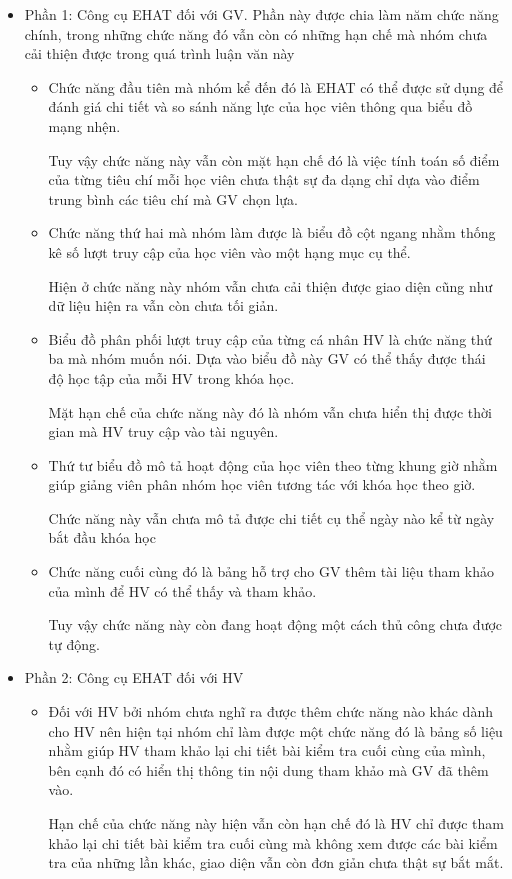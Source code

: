 \begin{itemize}
	\item Phần 1: Công cụ EHAT đối với GV.
	Phần này được chia làm năm chức năng chính, trong những chức năng đó vẫn còn có những hạn chế mà nhóm chưa cải thiện được trong quá trình luận văn này
	\begin{itemize}
		\item Chức năng đầu tiên mà nhóm kể đến đó là EHAT có thể được sử dụng để đánh giá chi tiết và so sánh năng lực của học viên thông qua biểu đồ mạng nhện. 
		
		Tuy vậy chức năng này vẫn còn mặt hạn chế đó là việc tính toán số điểm của từng tiêu chí mỗi học viên chưa thật sự đa dạng chỉ dựa vào điểm trung bình các tiêu chí mà GV chọn lựa.
		
		\item Chức năng thứ hai mà nhóm làm được là biểu đồ cột ngang nhằm thống kê số lượt truy cập của học viên vào một hạng mục cụ thể. 
		
		Hiện ở chức năng này nhóm vẫn chưa cải thiện được giao diện cũng như dữ liệu hiện ra vẫn còn chưa tối giản.
		
		\item Biểu đồ phân phối lượt truy cập của từng cá nhân HV là chức năng thứ ba mà nhóm muốn nói. Dựa vào biểu đồ này GV có thể thấy được thái độ học tập của mỗi HV trong khóa học. 
		
		Mặt hạn chế của chức năng này đó là nhóm vẫn chưa hiển thị được thời gian mà HV truy cập vào tài nguyên.
		
		\item Thứ tư biểu đồ mô tả hoạt động của học viên theo từng khung giờ nhằm giúp giảng viên phân nhóm học viên tương tác với khóa học theo giờ.
		
		Chức năng này vẫn chưa mô tả được chi tiết cụ thể ngày nào kể từ ngày bắt đầu khóa học
		
		\item Chức năng cuối cùng đó là bảng hỗ trợ cho GV thêm tài liệu tham khảo của mình để HV có thể thấy và tham khảo. 
		
		Tuy vậy chức năng này còn đang hoạt động một cách thủ công chưa được tự động.
	\end{itemize}

	\vskip 3cm
	\item Phần 2: Công cụ EHAT đối với HV
	
	\begin{itemize}
		\item Đối với HV bởi nhóm chưa nghĩ ra được thêm chức năng nào khác dành cho HV nên hiện tại nhóm chỉ làm được một chức năng đó là bảng số liệu nhằm giúp HV tham khảo lại chi tiết bài kiểm tra cuối cùng của mình, bên cạnh đó có hiển thị thông tin nội dung tham khảo mà GV đã thêm vào.
		
		Hạn chế của chức năng này hiện vẫn còn hạn chế đó là HV chỉ được tham khảo lại chi tiết bài kiểm tra cuối cùng mà không xem được các bài kiểm tra của những lần khác, giao diện vẫn còn đơn giản chưa thật sự bắt mắt.
	\end{itemize}
	
\end{itemize}

